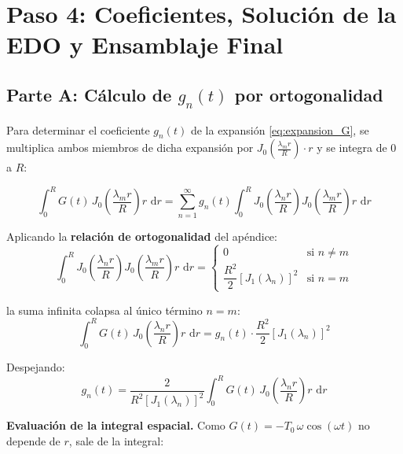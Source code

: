 \documentclass[12pt, a4paper]{article}
\newcommand{\dd}{\,\mathrm{d}}
\begin{document}
\section{Paso 4: Coeficientes, Solución de la EDO y Ensamblaje Final}

\subsection{Parte A: Cálculo de \texorpdfstring{$g_n(t)$}{gn(t)} por ortogonalidad}

Para determinar el coeficiente $g_n(t)$ de la expansión \eqref{eq:expansion_G},
se multiplica ambos miembros de dicha expansión por $J_0\!\left(\tfrac{\lambda_m r}{R}\right) \cdot r$
y se integra de $0$ a $R$:

\begin{equation}
  \int_0^R G(t)\, J_0\!\left(\frac{\lambda_m r}{R}\right) r\,\dd r
  = \sum_{n=1}^{\infty} g_n(t) \int_0^R J_0\!\left(\frac{\lambda_n r}{R}\right)
    J_0\!\left(\frac{\lambda_m r}{R}\right) r\,\dd r
\end{equation}

Aplicando la \textbf{relación de ortogonalidad} del apéndice:
\begin{equation}
  \int_0^R J_0\!\left(\frac{\lambda_n r}{R}\right)
  J_0\!\left(\frac{\lambda_m r}{R}\right) r\,\dd r
  =
  \begin{cases}
    0 & \text{si } n \neq m \\[4pt]
    \dfrac{R^2}{2}\left[J_1(\lambda_n)\right]^2 & \text{si } n = m
  \end{cases}
\end{equation}

la suma infinita colapsa al único término $n = m$:
\begin{equation}
  \int_0^R G(t)\, J_0\!\left(\frac{\lambda_n r}{R}\right) r\,\dd r
  = g_n(t)\cdot \frac{R^2}{2}\left[J_1(\lambda_n)\right]^2
\end{equation}

Despejando:
\begin{equation}
  g_n(t) = \frac{2}{R^2\left[J_1(\lambda_n)\right]^2}
  \int_0^R G(t)\, J_0\!\left(\frac{\lambda_n r}{R}\right) r\,\dd r
  \label{eq:gn_formula}
\end{equation}

\medskip
\noindent\textbf{Evaluación de la integral espacial.}
Como $G(t) = -T_0\,\omega\cos(\omega t)$ no depende de $r$, sale de la integral:
\end{document}
